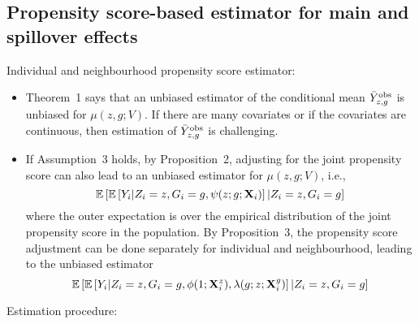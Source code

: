 \documentclass[10pt]{article}
\begin{document}
\subsection{Propensity score-based estimator for main and spillover effects}

Individual and neighbourhood propensity score estimator:

\begin{itemize}

\item
Theorem~1 says that an unbiased estimator of the conditional mean $\bar{Y}^{\text{obs}}_{z,g}$ is unbiased for $\mu(z,g;V)$. If there are many covariates or if the covariates are continuous, then estimation of $\bar{Y}^{\text{obs}}_{z,g}$ is challenging.

\item
If Assumption~3 holds, by Proposition~2, adjusting for the joint propensity score can also lead to an unbiased estimator for $\mu(z,g;V)$, i.e.,
\[
\mathbb{E}\left[\mathbb{E}\left[Y_i|Z_i=z,G_i=g,\psi(z;g;\mathbf{X}_i)\right]|Z_i=z,G_i=g\right]
\]
where the outer expectation is over the empirical distribution of the joint propensity score in the population. By Proposition~3, the propensity score adjustment can be done separately for individual and neighbourhood, leading to the unbiased estimator
\[
\mathbb{E}\left[\mathbb{E}\left[Y_i|Z_i=z,G_i=g,\phi(1;\mathbf{X}_i^z),\lambda(g;z;\mathbf{X}_i^g)\right]|Z_i=z,G_i=g\right]
\]

\end{itemize}

Estimation procedure:
\end{document}
